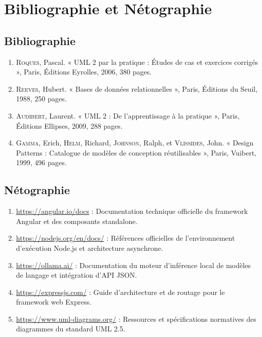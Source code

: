 \documentclass[12pt,a4paper]{report}
\begin{document}
\chapter*{Bibliographie et Nétographie}

\section*{Bibliographie}
\begin{enumerate}
  \item[1.] \textsc{Roques}, Pascal. « UML 2 par la pratique : Études de cas et exercices corrigés », Paris, Éditions Eyrolles, 2006, 380 pages.
  \item[2.] \textsc{Reeves}, Hubert. « Bases de données relationnelles », Paris, Éditions du Seuil, 1988, 250 pages.
  \item[3.] \textsc{Audibert}, Laurent. « UML 2 : De l'apprentissage à la pratique », Paris, Éditions Ellipses, 2009, 288 pages.
  \item[4.] \textsc{Gamma}, Erich, \textsc{Helm}, Richard, \textsc{Johnson}, Ralph, et \textsc{Vlissides}, John. « Design Patterns : Catalogue de modèles de conception réutilisables », Paris, Vuibert, 1999, 496 pages.
\end{enumerate}

\section*{Nétographie}
\begin{enumerate}
  \item[1.] \url{https://angular.io/docs} : Documentation technique officielle du framework Angular et des composants standalone.
  \item[2.] \url{https://nodejs.org/en/docs/} : Références officielles de l'environnement d'exécution Node.js et architecture asynchrone.
  \item[3.] \url{https://ollama.ai/} : Documentation du moteur d'inférence local de modèles de langage et intégration d'API JSON.
  \item[4.] \url{https://expressjs.com/} : Guide d'architecture et de routage pour le framework web Express.
  \item[5.] \url{https://www.uml-diagrams.org/} : Ressources et spécifications normatives des diagrammes du standard UML 2.5.
\end{enumerate}
\end{document}
